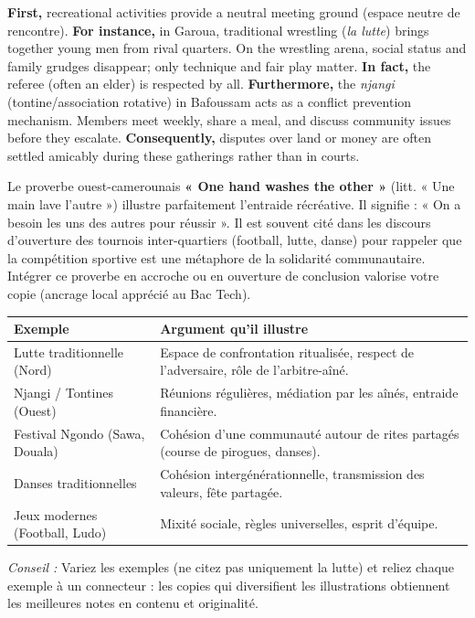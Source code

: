 \documentclass[11pt]{article}
\newcommand{\cle}[1]{{\popxbold\color{popdark}#1}}
\begin{document}
\begin{exemplebox}
\textbf{First,} recreational activities provide a \cle{neutral meeting ground} (espace neutre de rencontre). \textbf{For instance,} in Garoua, traditional wrestling (\emph{la lutte}) brings together young men from rival quarters. On the wrestling arena, social status and family grudges disappear; only technique and fair play matter. \textbf{In fact,} the referee (often an elder) is respected by all. \textbf{Furthermore,} the \emph{njangi} (tontine/association rotative) in Bafoussam acts as a conflict prevention mechanism. Members meet weekly, share a meal, and discuss community issues before they escalate. \textbf{Consequently,} disputes over land or money are often settled amicably during these gatherings rather than in courts.
\end{exemplebox}

\begin{savaistu}
Le proverbe ouest-camerounais \textbf{« One hand washes the other »} (litt. « Une main lave l'autre ») illustre parfaitement l'entraide récréative. Il signifie : « On a besoin les uns des autres pour réussir ». Il est souvent cité dans les discours d'ouverture des tournois inter-quartiers (football, lutte, danse) pour rappeler que la compétition sportive est une métaphore de la solidarité communautaire. Intégrer ce proverbe en \cle{accroche} ou en \cle{ouverture} de conclusion valorise votre copie (ancrage local apprécié au Bac Tech).
\end{savaistu}

\begin{exemplebox}
\begin{center}
\begin{tabularx}{\linewidth}{|l|X|}\hline
\textbf{Exemple} & \textbf{Argument qu'il illustre} \\ \hline
Lutte traditionnelle (Nord) & Espace de confrontation ritualisée, respect de l'adversaire, rôle de l'arbitre-aîné. \\ \hline
Njangi / Tontines (Ouest) & Réunions régulières, médiation par les aînés, entraide financière. \\ \hline
Festival Ngondo (Sawa, Douala) & Cohésion d'une communauté autour de rites partagés (course de pirogues, danses). \\ \hline
Danses traditionnelles & Cohésion intergénérationnelle, transmission des valeurs, fête partagée. \\ \hline
Jeux modernes (Football, Ludo) & Mixité sociale, règles universelles, esprit d'équipe. \\ \hline
\end{tabularx}
\end{center}
\emph{Conseil :} Variez les exemples (ne citez pas uniquement la lutte) et reliez chaque exemple à un connecteur : les copies qui diversifient les illustrations obtiennent les meilleures notes en \cle{contenu} et \cle{originalité}.
\end{exemplebox}
\end{document}
